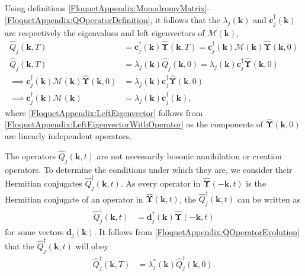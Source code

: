 Using definitions \eqref{FloquetAppendix:MonodromyMatrix}--\eqref{FloquetAppendix:QOperatorDefinition}, it follows that the $\lambda_j(\bm{k})$ and $\bm{c}_j^\dagger(\bm{k})$ are respectively the eigenvalues and left eigenvectors of $\mathcal{M}(\bm{k})$,
\begin{align}
    \hat{Q}_j(\bm{k}, T) &= \bm{c}_j^\dagger(\bm{k}) \hat{\bm{\Upsilon}}(\bm{k}, T) = \bm{c}_j^\dagger(\bm{k}) \mathcal{M}(\bm{k}) \hat{\bm{\Upsilon}}(\bm{k}, 0) \\
    \hat{Q}_j(\bm{k}, T) &= \lambda_j(\bm{k}) \hat{Q}_j(\bm{k}, 0) = \lambda_j(\bm{k}) \bm{c}_j^\dagger \hat{\bm{\Upsilon}}(\bm{k}, 0)\\
    \implies \bm{c}_j^\dagger(\bm{k}) \mathcal{M}(\bm{k}) \hat{\bm{\Upsilon}}(\bm{k}, 0) &= \lambda_j(\bm{k}) \bm{c}_j^\dagger \hat{\bm{\Upsilon}}(\bm{k}, 0) \label{FloquetAppendix:LeftEigenvectorWithOperator}\\
    \implies \bm{c}_j^\dagger(\bm{k}) \mathcal{M}(\bm{k}) &= \lambda_j(\bm{k}) \bm{c}_j^\dagger(\bm{k}), \label{FloquetAppendix:LeftEigenvector}
\end{align}
where \eqref{FloquetAppendix:LeftEigenvector} follows from \eqref{FloquetAppendix:LeftEigenvectorWithOperator} as the components of $\hat{\bm{\Upsilon}}(\bm{k}, 0)$ are linearly independent operators.

The operators $\hat{Q}_j(\bm{k}, t)$ are not necessarily bosonic annihilation or creation operators. To determine the conditions under which they are, we consider their Hermitian conjugates $\hat{Q}_j^\dagger(\bm{k}, t)$. As every operator in $\hat{\bm{\Upsilon}}(-\bm{k}, t)$ is the Hermitian conjugate of an operator in $\hat{\bm{\Upsilon}}(\bm{k}, t)$, the $\hat{Q}_j^\dagger(\bm{k}, t)$ can be written as
\begin{align}
    \label{FloquetAppendix:QDaggerDefinition}
    \hat{Q}_j^\dagger(\bm{k}, t) &= \bm{d}_j^\dagger(\bm{k}) \hat{\bm{\Upsilon}}(-\bm{k}, t)
\end{align}
for some vectors $\bm{d}_j(\bm{k})$. It follows from \eqref{FloquetAppendix:QOperatorEvolution} that the $\hat{Q}_j^\dagger(\bm{k}, t)$ will obey
\begin{align}
    \label{FloquetAppendix:QDaggerEvolution}
    \hat{Q}_j^\dagger(\bm{k}, T) &= \lambda_j^*(\bm{k}) \hat{Q}_j^\dagger(\bm{k}, 0).
\end{align}

